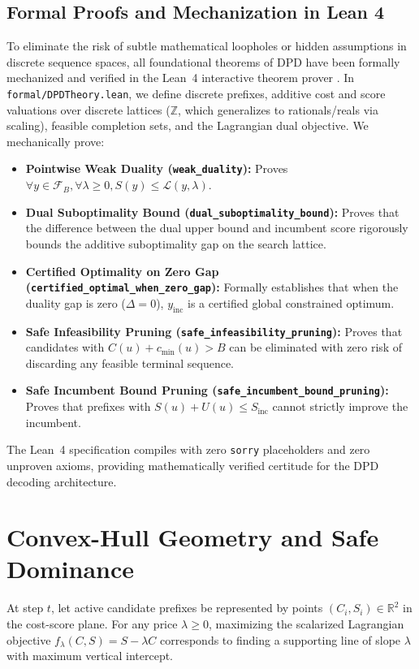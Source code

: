 \documentclass[11pt,a4paper]{article}
\theoremstyle{plain}
\theoremstyle{definition}
\theoremstyle{remark}
\begin{document}
\subsection{Formal Proofs and Mechanization in Lean 4}
To eliminate the risk of subtle mathematical loopholes or hidden assumptions in discrete sequence spaces, all foundational theorems of DPD have been formally mechanized and verified in the Lean~4 interactive theorem prover \citep{moura2021lean}. In \texttt{formal/DPDTheory.lean}, we define discrete prefixes, additive cost and score valuations over discrete lattices ($\mathbb{Z}$, which generalizes to rationals/reals via scaling), feasible completion sets, and the Lagrangian dual objective. We mechanically prove:
\begin{itemize}
    \item \textbf{Pointwise Weak Duality (\texttt{weak\_duality}):} Proves $\forall y \in \mathcal{F}_B, \forall \lambda \ge 0, S(y) \le \mathcal{L}(y, \lambda)$.
    \item \textbf{Dual Suboptimality Bound (\texttt{dual\_suboptimality\_bound}):} Proves that the difference between the dual upper bound and incumbent score rigorously bounds the additive suboptimality gap on the search lattice.
    \item \textbf{Certified Optimality on Zero Gap (\texttt{certified\_optimal\_when\_zero\_gap}):} Formally establishes that when the duality gap is zero ($\Delta = 0$), $y_{\text{inc}}$ is a certified global constrained optimum.
    \item \textbf{Safe Infeasibility Pruning (\texttt{safe\_infeasibility\_pruning}):} Proves that candidates with $C(u) + c_{\min}(u) > B$ can be eliminated with zero risk of discarding any feasible terminal sequence.
    \item \textbf{Safe Incumbent Bound Pruning (\texttt{safe\_incumbent\_bound\_pruning}):} Proves that prefixes with $S(u) + U(u) \le S_{\text{inc}}$ cannot strictly improve the incumbent.
\end{itemize}
The Lean~4 specification compiles with zero \texttt{sorry} placeholders and zero unproven axioms, providing mathematically verified certitude for the DPD decoding architecture.

\section{Convex-Hull Geometry and Safe Dominance}

At step $t$, let active candidate prefixes be represented by points $(C_i, S_i) \in \mathbb{R}^2$ in the cost-score plane.
For any price $\lambda \ge 0$, maximizing the scalarized Lagrangian objective $f_\lambda(C, S) = S - \lambda C$ corresponds to finding a supporting line of slope $\lambda$ with maximum vertical intercept.
\end{document}
